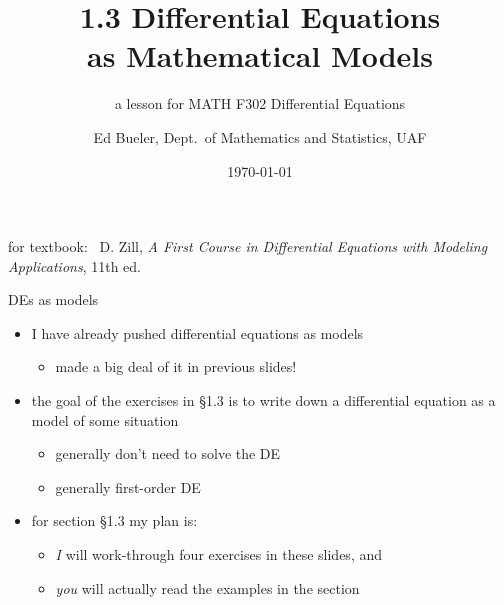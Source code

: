 \documentclass{beamer}
\title{1.3 Differential Equations \\ as Mathematical Models}
\subtitle{a lesson for MATH F302 Differential Equations}
\author{Ed Bueler, Dept.~of Mathematics and Statistics, UAF}
\date{\tiny \today}
\begin{document}


\begin{frame}
\titlepage

\centerline{\tiny for textbook: \, D. Zill, \emph{A First Course in Differential Equations with Modeling Applications}, 11th ed.}
\end{frame}


\begin{frame}{DEs as models}

\begin{itemize}
\item I have already pushed differential equations as models
    \begin{itemize}
    \item made a big deal of it in previous slides!
    \end{itemize}
\item the goal of the exercises in \S 1.3 is to \alert{write down} a differential equation as a model of some situation
    \begin{itemize}
    \item generally don't need to solve the DE
    \item generally first-order DE
    \end{itemize}
\item for section \S 1.3 my plan is:
    \begin{itemize}
    \item \emph{I} will work-through \alert{four} exercises in these slides, and
    \item \emph{you} will actually read the examples in the section
    \end{itemize}
\end{itemize}
\end{frame}
\end{document}
